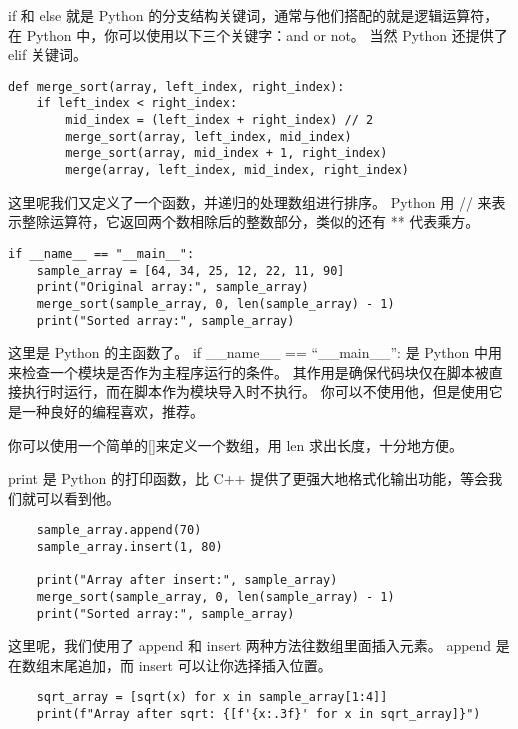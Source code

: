             if 和 else 就是 Python 的分支结构关键词，通常与他们搭配的就是逻辑运算符，
            在 Python 中，你可以使用以下三个关键字：and or not。
            当然 Python 还提供了 elif 关键词。

            \begin{verbatim}
def merge_sort(array, left_index, right_index):
    if left_index < right_index:
        mid_index = (left_index + right_index) // 2
        merge_sort(array, left_index, mid_index)
        merge_sort(array, mid_index + 1, right_index)
        merge(array, left_index, mid_index, right_index)
            \end{verbatim}

            这里呢我们又定义了一个函数，并递归的处理数组进行排序。
            Python 用 // 来表示整除运算符，它返回两个数相除后的整数部分，类似的还有 ** 代表乘方。

            \begin{verbatim}
if __name__ == "__main__":
    sample_array = [64, 34, 25, 12, 22, 11, 90]
    print("Original array:", sample_array)
    merge_sort(sample_array, 0, len(sample_array) - 1)
    print("Sorted array:", sample_array)
            \end{verbatim}

            这里是 Python 的主函数了。
            if \_\_name\_\_ == ``\_\_main\_\_'':
            是 Python 中用来检查一个模块是否作为主程序运行的条件。
            其作用是确保代码块仅在脚本被直接执行时运行，而在脚本作为模块导入时不执行。
            你可以不使用他，但是使用它是一种良好的编程喜欢，推荐。

            你可以使用一个简单的[]来定义一个数组，用 len 求出长度，十分地方便。

            print 是 Python 的打印函数，比 C++ 提供了更强大地格式化输出功能，等会我们就可以看到他。

            \begin{verbatim}
    sample_array.append(70)
    sample_array.insert(1, 80)

    print("Array after insert:", sample_array)
    merge_sort(sample_array, 0, len(sample_array) - 1)
    print("Sorted array:", sample_array)
            \end{verbatim}

            这里呢，我们使用了 append 和 insert 两种方法往数组里面插入元素。
            append 是在数组末尾追加，而 insert 可以让你选择插入位置。

            \begin{verbatim}
    sqrt_array = [sqrt(x) for x in sample_array[1:4]]
    print(f"Array after sqrt: {[f'{x:.3f}' for x in sqrt_array]}")
            \end{verbatim}

